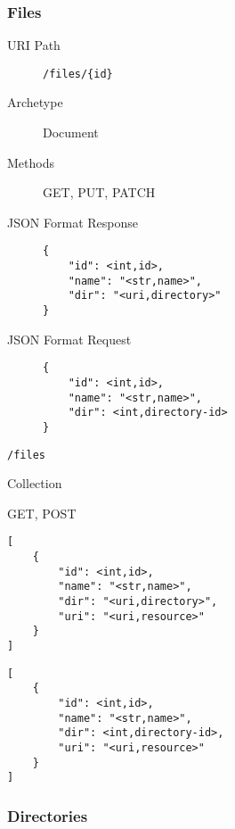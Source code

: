 \documentclass[10pt,a4paper]{scrartcl}
\begin{document}
\pagebreak
\subsubsection{Files}

\begin{mdframed}[style=def]
\begin{description}
	\item[URI Path] \texttt{/files/\{id\}}
	\item[Archetype] Document
	\item[Methods] GET, PUT, PATCH
	\item[JSON Format Response] \hfill
\begin{lstlisting}
{
	"id": <int,id>,
	"name": "<str,name>",
	"dir": "<uri,directory>"
}
\end{lstlisting}
	\item[JSON Format Request] \hfill
\begin{lstlisting}
{
	"id": <int,id>,
	"name": "<str,name>",
	"dir": <int,directory-id>
}
\end{lstlisting}
\end{description}
\end{mdframed}

\begin{mdframed}[style=def]
\begin{description*}
	\item[URI Path] \texttt{/files}
	\item[Archetype] Collection
	\item[Methods] GET, POST
	\item[JSON Format Response] \hfill
\begin{lstlisting}
[
    {
	    "id": <int,id>,
	    "name": "<str,name>",
	    "dir": "<uri,directory>",
	    "uri": "<uri,resource>"
    }
]
\end{lstlisting}
	\item[JSON Format Request] \hfill
\begin{lstlisting}
[
    {
	    "id": <int,id>,
	    "name": "<str,name>",
	    "dir": <int,directory-id>,
	    "uri": "<uri,resource>"
    }
]
\end{lstlisting}
\end{description*}
\end{mdframed}


\pagebreak
\subsubsection{Directories}
\end{document}
